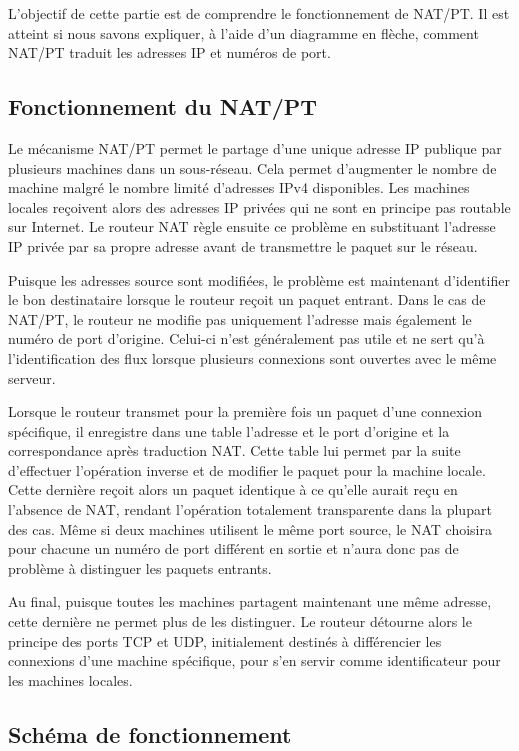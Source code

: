 \documentclass[11pt,a4paper]{article}
\begin{document}
L'objectif de cette partie est de comprendre le fonctionnement de NAT/PT. Il est atteint si nous savons expliquer, à l'aide d'un diagramme en flèche, comment NAT/PT traduit les adresses IP et numéros de port.

\subsection{Fonctionnement du NAT/PT}

Le mécanisme NAT/PT permet le partage d'une unique adresse IP publique par plusieurs machines dans un sous-réseau. Cela permet d'augmenter le nombre de machine malgré le nombre limité d'adresses IPv4 disponibles.
Les machines locales reçoivent alors des adresses IP privées qui ne sont en principe pas routable sur Internet. Le routeur NAT règle ensuite ce problème en substituant l'adresse IP privée par sa propre adresse avant de transmettre le paquet sur le réseau. 

Puisque les adresses source sont modifiées, le problème est maintenant d'identifier le bon destinataire lorsque le routeur reçoit un paquet entrant.
Dans le cas de NAT/PT, le routeur ne modifie pas uniquement l'adresse mais également le numéro de port d'origine. Celui-ci n'est généralement pas utile et ne sert qu'à l'identification des flux lorsque plusieurs connexions sont ouvertes avec le même serveur.

Lorsque le routeur transmet pour la première fois un paquet d'une connexion spécifique, il enregistre dans une table l'adresse et le port d'origine et la correspondance après traduction NAT. Cette table lui permet par la suite d'effectuer l'opération inverse et de modifier le paquet pour la machine locale. Cette dernière reçoit alors un paquet identique à ce qu'elle aurait reçu en l'absence de NAT, rendant l'opération totalement transparente dans la plupart des cas. Même si deux machines utilisent le même port source, le NAT choisira pour chacune un numéro de port différent en sortie et n'aura donc pas de problème à distinguer les paquets entrants.

Au final, puisque toutes les machines partagent maintenant une même adresse, cette dernière ne permet plus de les distinguer. Le routeur détourne alors le principe des ports TCP et UDP, initialement destinés à différencier les connexions d'une machine spécifique, pour s'en servir comme identificateur pour les machines locales.

\subsection{Schéma de fonctionnement}
\end{document}
